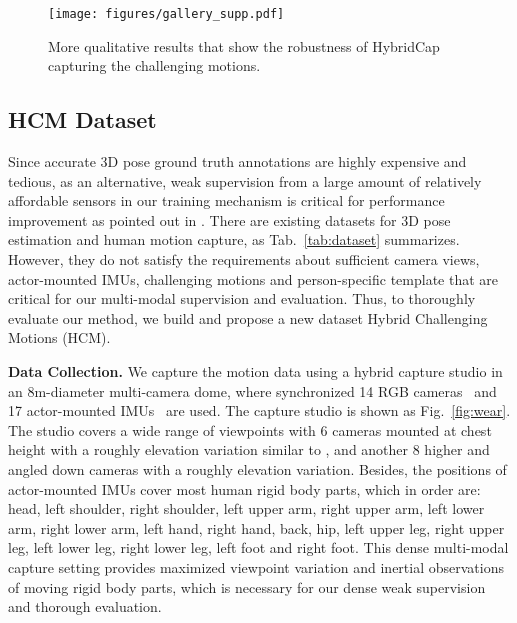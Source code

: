 \documentclass[letterpaper]{article} \usepackage{aaai23}  \usepackage{times}  \usepackage{helvet}  \usepackage{courier}  \usepackage[hyphens]{url}  \usepackage{graphicx} \urlstyle{rm} \def\UrlFont{\rm}  \usepackage{natbib}  \usepackage{caption} \frenchspacing  \setlength{\pdfpagewidth}{8.5in}  \setlength{\pdfpageheight}{11in}  \usepackage{algorithm}
\newcommand{\myparagraph}[1]{\vspace{0.1em}\noindent\textbf{#1}}
\begin{document}
 \vspace{-2mm}

\begin{figure*}[t]
	\centering
	\texttt{[image: figures/gallery\_supp.pdf]}
	\caption{More qualitative results that show the robustness of HybridCap capturing the challenging motions.}
	\label{fig:gallery}
\end{figure*}


\subsection{HCM Dataset}

Since accurate 3D pose ground truth annotations are highly expensive and tedious, as an alternative, weak supervision from a large amount of relatively affordable sensors in our training mechanism is critical for performance improvement as pointed out in \cite{DeepCap_CVPR2020}. 
There are existing datasets for 3D pose estimation and human motion capture, as Tab.~\ref{tab:dataset} summarizes.
However, they do not satisfy the requirements about sufficient camera views, actor-mounted IMUs, challenging motions and person-specific template that are critical for our multi-modal supervision and evaluation.
Thus, to thoroughly evaluate our method, we build and propose a new dataset Hybrid Challenging Motions (HCM). 

\myparagraph{Data Collection.}
We capture the motion data using a hybrid capture studio in an 8m-diameter multi-camera dome, where synchronized 14 RGB cameras~\cite{Z-CAM} and 17 actor-mounted IMUs~\cite{NOITOM} are used. 
The capture studio is shown as Fig.~\ref{fig:wear}. The studio covers a wide range of viewpoints with 6 cameras mounted at chest height with a roughly  elevation variation similar to \cite{mehta2017monocular}, and another 8 higher and angled down  cameras with a roughly  elevation variation.
Besides, the positions of actor-mounted IMUs cover most human rigid body parts, which in order are: head, left shoulder, right shoulder, left upper arm, right upper arm, left lower arm, right lower arm, left hand, right hand, back, hip, left upper leg, right upper leg, left lower leg, right lower leg, left foot and right foot. 
This dense multi-modal capture setting provides maximized viewpoint variation and inertial observations of moving rigid body parts, which is necessary for our dense weak supervision and thorough evaluation.
\end{document}
